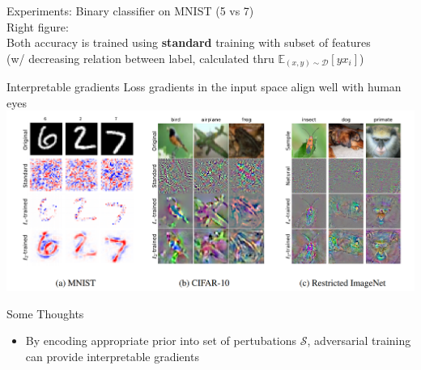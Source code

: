 \documentclass{beamer}
\begin{document}
\begin{frame}{Experiments: Binary classifier on MNIST (5 vs 7)}
  \\
  Right figure: \\Both accuracy is trained using \textbf{standard} training with subset of features \\
(w/ decreasing relation between label, calculated thru $\mathbb{E}_{(x,y) \sim \mathcal{D}}[yx_i]$)
\end{frame}

\begin{frame}{Interpretable gradients}
  Loss gradients in the input space align well with human eyes
  \includegraphics[width=\textwidth]{fig/p2/int-grad.png}
\end{frame}

\begin{frame}{Some Thoughts}
  \begin{itemize}
    \item By encoding appropriate prior into set of pertubations $\mathcal{S}$, adversarial training can provide interpretable gradients 
  \end{itemize}
\end{frame}

\end{document}
